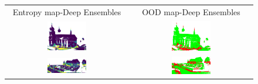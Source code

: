         \begin{figure}[h!]
            \centering
            \begin{tabular}{cc}
                Entropy map-Deep Ensembles & OOD map-Deep Ensembles \\
                \includegraphics[width=0.33\textwidth, height=0.18\textheight]{images/ood_imgs/de_sem3d/de_ent_10_1.png}& 
                \includegraphics[width=0.33\textwidth, height=0.18\textheight]{images/ood_imgs/de_sem3d/de_ent_ood_auroc_1.png}\\
    
                \includegraphics[width=0.33\textwidth, height=0.18\textheight]{images/ood_imgs/de_sem3d/de_ent_10_2.png}& 
                \includegraphics[width=0.33\textwidth, height=0.18\textheight]{images/ood_imgs/de_sem3d/de_ent_ood_auroc_2.png}\\
    

\end{tabular}
\end{figure}
